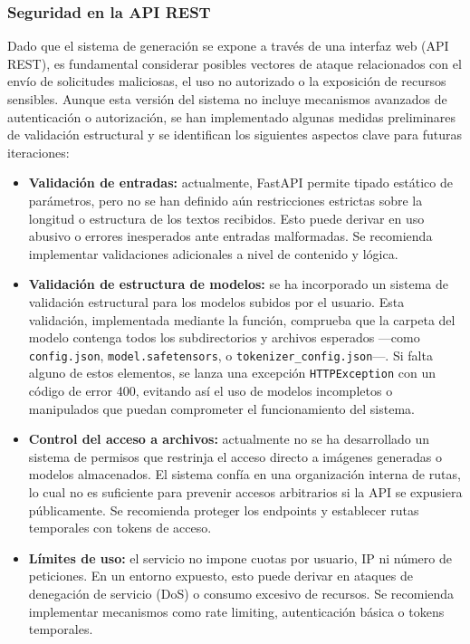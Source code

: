 \subsubsection{Seguridad en la API REST}

Dado que el sistema de generación se expone a través de una interfaz web (API REST), es fundamental considerar posibles vectores de ataque relacionados con el envío de solicitudes maliciosas, el uso no autorizado o la exposición de recursos sensibles. Aunque esta versión del sistema no incluye mecanismos avanzados de autenticación o autorización, se han implementado algunas medidas preliminares de validación estructural y se identifican los siguientes aspectos clave para futuras iteraciones:

\begin{itemize}
    \item \textbf{Validación de entradas:} actualmente, FastAPI permite tipado estático de parámetros, pero no se han definido aún restricciones estrictas sobre la longitud o estructura de los textos recibidos. Esto puede derivar en uso abusivo o errores inesperados ante entradas malformadas. Se recomienda implementar validaciones adicionales a nivel de contenido y lógica.
    
    \item \textbf{Validación de estructura de modelos:} se ha incorporado un sistema de validación estructural para los modelos subidos por el usuario. Esta validación, implementada mediante la función, comprueba que la carpeta del modelo contenga todos los subdirectorios y archivos esperados —como \texttt{config.json}, \texttt{model.safetensors}, o \texttt{tokenizer\_config.json}—. Si falta alguno de estos elementos, se lanza una excepción \texttt{HTTPException} con un código de error 400, evitando así el uso de modelos incompletos o manipulados que puedan comprometer el funcionamiento del sistema.

    \item \textbf{Control del acceso a archivos:} actualmente no se ha desarrollado un sistema de permisos que restrinja el acceso directo a imágenes generadas o modelos almacenados. El sistema confía en una organización interna de rutas, lo cual no es suficiente para prevenir accesos arbitrarios si la API se expusiera públicamente. Se recomienda proteger los endpoints y establecer rutas temporales con tokens de acceso.

    \item \textbf{Límites de uso:} el servicio no impone cuotas por usuario, IP ni número de peticiones. En un entorno expuesto, esto puede derivar en ataques de denegación de servicio (DoS) o consumo excesivo de recursos. Se recomienda implementar mecanismos como rate limiting, autenticación básica o tokens temporales.


\end{itemize}
